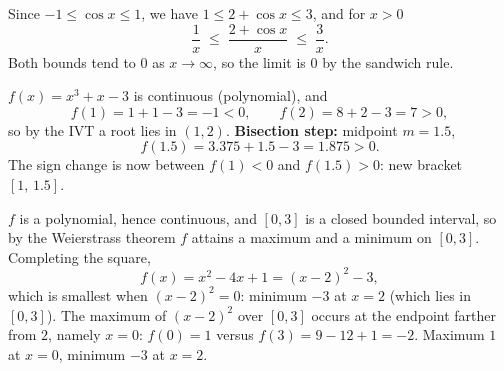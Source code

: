 \begin{solutions}
  \item Since $-1\le\cos x\le 1$, we have $1\le 2+\cos x\le 3$, and for
        $x>0$
        \[
          \frac{1}{x}\;\le\;\frac{2+\cos x}{x}\;\le\;\frac{3}{x} .
        \]
        Both bounds tend to $0$ as $x\to\infty$, so the limit is $0$ by
        the sandwich rule.

  \item $f(x)=x^{3}+x-3$ is continuous (polynomial), and
        \[
          f(1)=1+1-3=-1<0,
          \qquad
          f(2)=8+2-3=7>0,
        \]
        so by the IVT a root lies in $(1,2)$. \textbf{Bisection step:}
        midpoint $m=1.5$,
        \[
          f(1.5)=3.375+1.5-3=1.875>0 .
        \]
        The sign change is now between $f(1)<0$ and $f(1.5)>0$: new
        bracket $[1,\,1.5]$.

  \item $f$ is a polynomial, hence continuous, and $[0,3]$ is a closed
        bounded interval, so by the Weierstrass theorem $f$ attains a
        maximum and a minimum on $[0,3]$. Completing the square,
        \[
          f(x)=x^{2}-4x+1=(x-2)^{2}-3 ,
        \]
        which is smallest when $(x-2)^{2}=0$: minimum $-3$ at $x=2$
        (which lies in $[0,3]$). The maximum of $(x-2)^{2}$ over
        $[0,3]$ occurs at the endpoint farther from $2$, namely $x=0$:
        $f(0)=1$ versus $f(3)=9-12+1=-2$. Maximum $1$ at $x=0$,
        minimum $-3$ at $x=2$.
\end{solutions}
